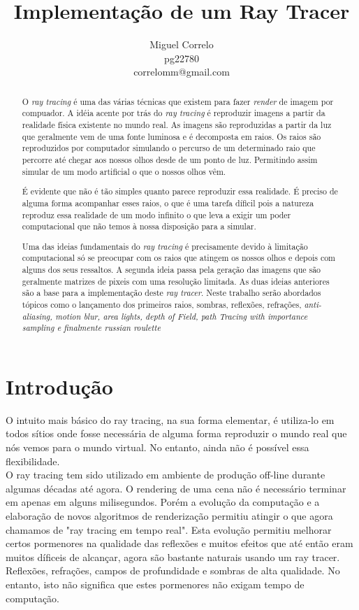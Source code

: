 \documentclass[12pt]{article}
\title{Implementação de um Ray Tracer}
\author{Miguel Correlo \\
\small{pg22780}\\
\small{correlomm@gmail.com}}
\begin{document}
\maketitle

\begin{abstract}
O {\it ray tracing} é uma das várias técnicas que existem para fazer {\it render} de imagem por compuador. A idéia acente por trás do {\it ray tracing} é reproduzir imagens a partir da realidade física existente no mundo real. As imagens são reproduzidas a partir da luz que geralmente vem de uma fonte luminosa e é decomposta em raios. Os raios são reproduzidos por computador simulando o percurso de um determinado raio que percorre até chegar aos nossos olhos desde de um ponto de luz. Permitindo assim simular de um modo artificial o que o nossos olhos vêm.

É evidente que não é tão simples quanto parece reproduzir essa realidade. É preciso de alguma forma acompanhar esses raios, o que é uma tarefa díficil pois a natureza reproduz essa realidade de um modo infinito o que leva a exigir um poder computacional que não temos à nossa disposição para a simular.

Uma das ideias fundamentais do {\it ray tracing} é precisamente devido à limitação computacional só se preocupar com os raios que atingem os nossos olhos e depois com alguns dos seus ressaltos. A segunda ideia passa pela geração das imagens que são geralmente matrizes de pixeis com uma resolução limitada. As duas ideias anteriores são a base para a implementação deste {\it ray tracer}. Neste trabalho serão abordados tópicos como o lançamento dos primeiros raios, sombras, reflexões, refrações, {\it anti-aliasing, motion blur, area lights, depth of Field, path Tracing with importance sampling e finalmente russian roulette}


\end{abstract}

\section{Introdução}
\vspace{10 mm}
\hspace{8 mm} O intuito mais básico do ray tracing, na sua forma elementar, é utiliza-lo em todos sítios onde fosse necessária de alguma forma reproduzir o mundo real que nós vemos para o mundo virtual. No entanto, ainda não é possível essa flexibilidade.\\

O ray tracing tem sido utilizado em ambiente de produção off-line durante algumas décadas até agora. O rendering de uma cena não é necessário terminar em apenas em alguns milisegundos. Porém a evolução da computação e a elaboração de novos algoritmos de renderização permitiu atingir o que agora chamamos de "ray tracing em tempo real". Esta evolução permitiu melhorar certos pormenores na qualidade das reflexões e muitos efeitos que até então eram muitos díficeis de alcançar, agora são bastante naturais usando um ray tracer. Reflexões, refrações, campos de profundidade e sombras de alta qualidade. No entanto, isto não significa que estes pormenores não exigam tempo de computação.\\
\end{document}

